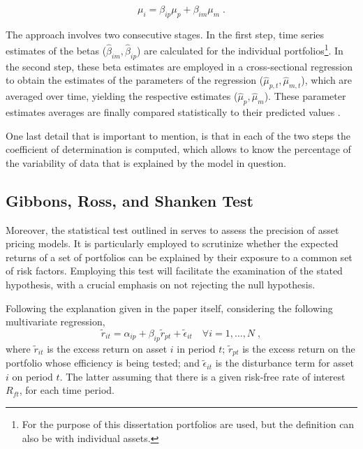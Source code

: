 \begin{equation}
	\label{eq:model-popular}
	\mu_{i} = \beta_{ip}\mu_{p} + \beta_{im}\mu_{m}\;.
\end{equation}

The approach involves two consecutive stages. In the first step, time series estimates of the betas ($\hat{\beta}_{im},\hat{\beta}_{ip}$) are calculated for the individual portfolios\footnote{For the purpose of this dissertation portfolios are used, but the definition can also be with individual assets.}. In the second step, these beta estimates are employed in a cross-sectional regression to obtain the estimates of the parameters of the regression ($\hat{\mu}_{p,t}, \hat{\mu}_{m,t}$), which are averaged over time, yielding the respective estimates ($\hat{\mu}_{p}, \hat{\mu}_{m}$). These parameter estimates averages are finally compared statistically to their predicted values \parencite{balvers2001}.

One last detail that is important to mention, is that in each of the two steps the coefficient of determination is computed, which allows to know the percentage of the variability of data that is explained by the model in question.

\subsection{Gibbons, Ross, and Shanken Test}
\label{GRStest}
Moreover, the statistical test outlined in \parencite{GRS1989} serves to assess the precision of asset pricing models. It is particularly employed to scrutinize whether the expected returns of a set of portfolios can be explained by their exposure to a common set of risk factors. Employing this test will facilitate the examination of the stated hypothesis, with a crucial emphasis on not rejecting the null hypothesis. 

Following the explanation given in the paper itself, considering the following multivariate regression,
\begin{equation}
	\label{eq: reg-example}
	\tilde{r}_{it} = \alpha_{ip} + \beta_{ip}\tilde{r}_{pt}+\tilde{\epsilon}_{it}\quad \forall i=1,\dots,N\;,
\end{equation}
where $\tilde{r}_{it}$ is the excess return on asset $i$ in period $t$; $\tilde{r}_{pt}$ is the excess return on the portfolio whose efficiency is being tested; and $\tilde{\epsilon}_{it}$ is the disturbance term for asset $i$ on period $t$. The latter assuming that there is a given risk-free rate of interest $R_{ft}$, for each time period.

